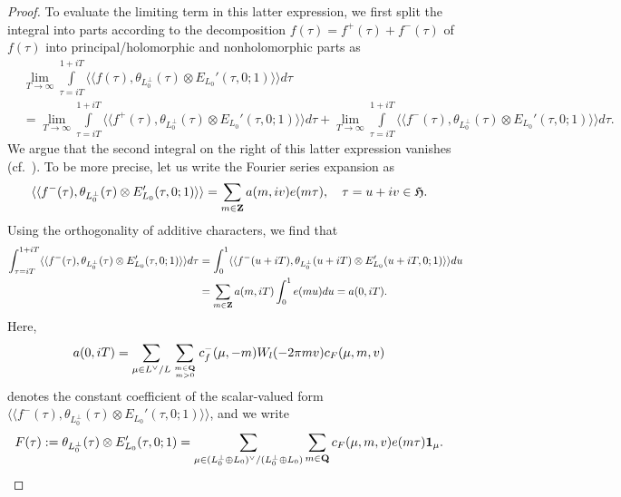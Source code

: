 \documentclass{amsart}
\theoremstyle{definition}
\theoremstyle{definition}
\theoremstyle{definition}
\begin{document}
\begin{proof}
To evaluate the limiting term in this latter expression, we first  split the integral into parts according to the decomposition 
$f(\tau) = f^+(\tau) + f^-(\tau)$ of $f(\tau)$ into principal/holomorphic and nonholomorphic parts as 
\begin{align*} &\lim_{T \rightarrow \infty} \int\limits_{\tau = i T}^{1 + i T} \langle \langle f(\tau), \theta_{L_0^{\perp}}(\tau)
\otimes E_{L_0}'(\tau, 0; 1) \rangle \rangle d \tau \\ &= 
\lim_{T \rightarrow \infty} \int\limits_{\tau = i T}^{1 + i T} \langle \langle f^+(\tau), \theta_{L_0^{\perp}}(\tau)
\otimes E_{L_0}'(\tau, 0; 1) \rangle \rangle d \tau 
+ \lim_{T \rightarrow \infty} \int\limits_{\tau = i T}^{1 + i T} \langle \langle f^-(\tau), \theta_{L_0^{\perp}}(\tau) 
\otimes E_{L_0}'(\tau, 0; 1) \rangle \rangle d \tau. \end{align*}
We argue that the second integral on the right of this latter expression vanishes (cf.~\cite[Theorem 3.5]{Eh}).
To be more precise, let us write the Fourier series expansion as 
\begin{align*} \langle \langle f^-(\tau), \theta_{L_0^{\perp}}(\tau) \otimes E_{L_0}'(\tau, 0; 1) \rangle \rangle 
&= \sum\limits_{ m \in {\bf{Z}} } a(m, iv) e(m \tau), \quad \tau = u + iv \in \mathfrak{H}. \end{align*}
Using the orthogonality of additive characters, we find that 
\begin{align*} \int_{\tau = i T}^{1 + i T}\langle \langle f^-(\tau), \theta_{L_0^{\perp}}(\tau) \otimes E_{L_0}'(\tau, 0; 1) \rangle \rangle d \tau
&= \int_0^1 \langle \langle f^-(u + iT), \theta_{L_0^{\perp}}(u + iT) \otimes E_{L_0}'(u + iT, 0; 1) \rangle \rangle du \\
&= \sum\limits_{m \in {\bf{Z}}} a(m, iT) \int_0^1 e(m u) du = a(0, iT). \end{align*}
Here,  \begin{align*} a(0, iT) &= \sum\limits_{ \mu \in L^{\vee}/L }  \sum\limits_{ m \in {\bf{Q}}\atop m>0 } c_f^- (\mu, -m) W_l(- 2 \pi m v) c_F(\mu, m, v) \end{align*}
denotes the constant coefficient of the scalar-valued form 
$\langle \langle f^-(\tau), \theta_{L_0^{\perp}}(\tau) \otimes E_{L_0}'(\tau, 0; 1) \rangle \rangle$, and we write 
\begin{align*} F(\tau) &:= \theta_{L_0^{\perp}}(\tau) \otimes E^{\prime}_{L_0}(\tau, 0; 1) = 
\sum\limits_{ \mu \in (L_0^{\perp} \oplus L_0)^{\vee}/(L_0^{\perp} \oplus L_0) } \sum\limits_{ m \in {\bf{Q}} } c_F(\mu, m, v) e(m \tau) {\bf{1}}_{\mu}. \end{align*}

\end{proof}
\end{document}

